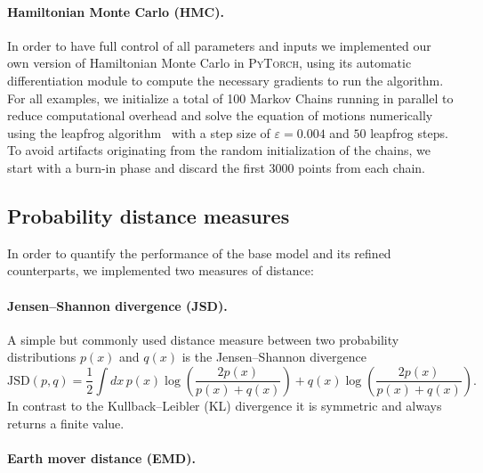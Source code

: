 \paragraph{Hamiltonian Monte Carlo (HMC).}
In order to have full control of all parameters and inputs we implemented our own version of Hamiltonian Monte Carlo in \textsc{PyTorch}, using its automatic differentiation module to compute the necessary gradients to run the algorithm.
For all examples, we initialize a total of 100 Markov Chains running in parallel to reduce computational overhead and solve the equation of motions numerically using the leapfrog algorithm~\cite{neal2012mcmc} with a step size of $\varepsilon=0.004$ and $50$ leapfrog steps.
To avoid artifacts originating from the random initialization of the chains, we start with a burn-in phase and discard the first 3000 points from each chain.

\subsection{Probability distance measures}
\label{sec:distance_measure}

In order to quantify the performance of the base model and its refined counterparts, we implemented two measures of distance:

\paragraph{Jensen--Shannon divergence (JSD).}

A simple but commonly used distance measure between two probability distributions $p(x)$ and $q(x)$ is the Jensen–Shannon divergence
\begin{equation}
 \mathrm{JSD}(p,q) =  \frac{1}{2}\int dx\,p(x)\log\left(\frac{2p(x)}{p(x)+q(x)}\right)+q(x)\log\left(\frac{2p(x)}{p(x)+q(x)}\right).
\end{equation}
In contrast to the Kullback–Leibler (KL) divergence it is symmetric and always returns a finite value.

\paragraph{Earth mover distance (EMD).}

